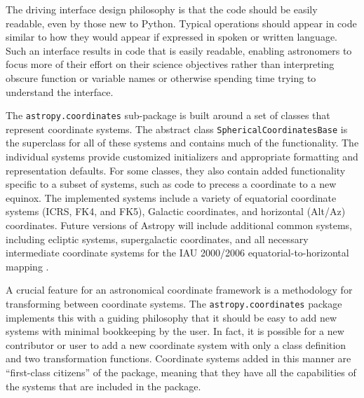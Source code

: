 \documentclass[traditabstract]{aa}
\begin{document}
The driving interface design philosophy is that the code should
be easily readable, even by those new to Python. Typical operations should
appear in code similar to how they would appear if expressed in spoken or 
written language. Such an interface results in code that is easily readable,
enabling astronomers to focus more of their effort on their science objectives
rather than interpreting obscure function or variable names or otherwise 
spending time trying to understand the interface.



The \texttt{astropy.coordinates} sub-package
is built around a set of classes that represent coordinate systems.
The abstract class \texttt{SphericalCoordinatesBase} is the superclass
for all of these systems and contains much of the functionality. The
individual systems provide customized initializers and appropriate
formatting and representation defaults. For some classes, they also
contain added functionality specific to a subset of systems, such as
code to precess a coordinate to a new equinox. The implemented
systems include a variety of equatorial coordinate systems (ICRS, FK4,
and FK5), Galactic coordinates, and horizontal (Alt/Az) coordinates.
Future versions of Astropy will include additional
common systems, including ecliptic systems, supergalactic coordinates,
and all necessary intermediate coordinate systems for the IAU
2000/2006 equatorial-to-horizontal mapping \citep[e.g.,][]{soffel03,
  usnocircular179}.



A crucial feature for an astronomical coordinate framework is a methodology for
transforming between coordinate systems. The \texttt{astropy.coordinates}
package implements this with a guiding philosophy that it
should be easy to add new systems with minimal bookkeeping by the
user. In fact, it is possible for a new contributor or user to add a new
coordinate system with only a class definition and two transformation
functions. Coordinate systems added in this manner are ``first-class citizens'' of the
package, meaning that they have all the capabilities of the systems that are included in the
package.
\end{document}
